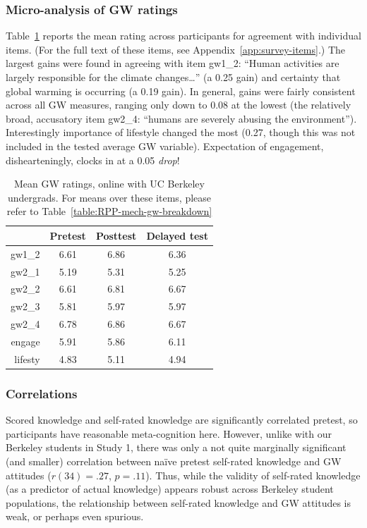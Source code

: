 \subsubsection{Micro-analysis of GW ratings}

Table~\ref{table:uc-online-gw-means} reports the mean rating across participants
for agreement with individual items. (For the full text of these items, see
Appendix~\ref{app:survey-items}.) The largest gains were found in agreeing with
item \textsf{gw1_2}: ``Human activities are largely responsible for the climate
changes\ldots'' (a 0.25 gain) and certainty that global warming is occurring (a
0.19 gain).  In general, gains were fairly consistent across all GW measures,
ranging only down to 0.08 at the lowest (the relatively broad, accusatory item
\textsf{gw2_4}: “humans are severely abusing the environment”). Interestingly
importance of lifestyle changed the most (0.27, though this was not included in
the tested average GW variable).  Expectation of engagement, dishearteningly,
clocks in at a 0.05 \emph{drop}! 

\begin{table}
\caption{Mean GW ratings, online with UC Berkeley undergrads. For means over
    these items, please refer to
         Table~\ref{table:RPP-mech-gw-breakdown}} 
\label{table:uc-online-gw-means}
\centering
\begin{tabular}{>{\sffamily}rccc}
  \toprule
 & Pretest & Posttest & Delayed test \\ 
  \midrule
  gw1_2 & 6.61 & 6.86 & 6.36 \\ 
  gw2_1 & 5.19 & 5.31 & 5.25 \\ 
  gw2_2 & 6.61 & 6.81 & 6.67 \\ 
  gw2_3 & 5.81 & 5.97 & 5.97 \\ 
  gw2_4 & 6.78 & 6.86 & 6.67 \\ 
  engage & 5.91 & 5.86 & 6.11 \\ 
  lifesty & 4.83 & 5.11 & 4.94 \\ 
  \bottomrule
\end{tabular}
\end{table}

\subsubsection{Correlations}

Scored knowledge and self-rated knowledge are significantly correlated pretest,
so participants have reasonable meta-cognition here. However, unlike with our
Berkeley students in Study 1, there was only a not quite marginally significant
(and smaller) correlation between na\"ive pretest self-rated knowledge and GW
attitudes ($r(34)=.27$, $p=.11$). Thus, while the validity of self-rated
knowledge (as a predictor of actual knowledge) appears robust across Berkeley
student populations, the relationship between self-rated knowledge and GW
attitudes is weak, or perhaps even spurious.

